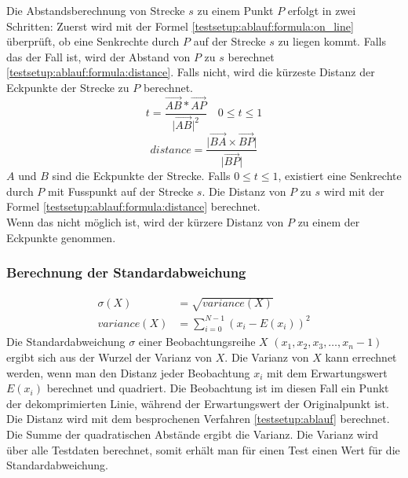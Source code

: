 Die Abstandsberechnung von Strecke $s$ zu einem Punkt $P$ erfolgt in zwei Schritten: Zuerst wird mit der Formel \eqref{testsetup:ablauf:formula:on_line} überprüft, ob eine Senkrechte durch $P$ auf der Strecke $s$ zu liegen kommt. Falls das der Fall ist, wird der Abstand von $P$ zu $s$ berechnet \eqref{testsetup:ablauf:formula:distance}. Falls nicht, wird die kürzeste Distanz der Eckpunkte der Strecke zu $P$ berechnet.\\
\begin{equation} \label{testsetup:ablauf:formula:on_line}
 t = \frac{\vec{AB}*\vec{AP}}{\lvert \vec{AB}\rvert ^2} \quad 0 \leq t \leq 1
\end{equation}
\begin{equation}\label{testsetup:ablauf:formula:distance}
distance = \frac{\lvert \vec{BA}\times \vec{BP}\rvert}{\lvert \vec{BP} \rvert}
\end{equation}
$A$ und $B$ sind die Eckpunkte der Strecke. Falls $0 \leq t \leq 1$, existiert eine Senkrechte durch $P$ mit Fusspunkt auf der Strecke $s$. Die Distanz von $P$ zu $s$ wird mit der Formel \eqref{testsetup:ablauf:formula:distance} berechnet.\\
Wenn das nicht möglich ist, wird der kürzere Distanz von $P$ zu einem der Eckpunkte genommen. 

\subsubsection{Berechnung der Standardabweichung}
\begin{equation} \label{testsetup:ablauf:formula:deviation}
	\begin{split}
		\sigma(X)& = \sqrt{variance(X)}\\
		variance(X) & = \sum_{i=0}^{N-1}{(x_i - E(x_i))^2}
	\end{split}
\end{equation}
Die Standardabweichung $\sigma$ einer Beobachtungsreihe $X$ $(x_1,x_2,x_3,\ldots, x_n-1)$ ergibt sich aus der Wurzel der Varianz von $X$. Die Varianz von $X$ kann errechnet werden, wenn man den Distanz jeder Beobachtung $x_i$ mit dem Erwartungswert $E(x_i)$ berechnet und quadriert. Die Beobachtung ist im diesen Fall ein Punkt der dekomprimierten Linie, während der Erwartungswert der Originalpunkt ist. Die Distanz wird mit dem besprochenen Verfahren \ref{testsetup:ablauf} berechnet. Die Summe der quadratischen Abstände ergibt die Varianz. Die Varianz wird über alle Testdaten berechnet, somit erhält man für einen Test einen Wert für die Standardabweichung.

